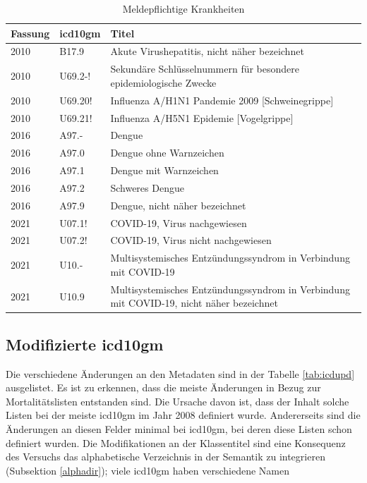 \begin{table}[ht]
	\centering
	\small
	\caption[Meldepflichtige \acs{icd10gm}]{Meldepflichtige Krankheiten}
	\label{tab:meldung}
	\begin{tabular}{|l|l|p{10.5cm}|}
		\hline
		\rowcolor{lightgray} Fassung & \acs{icd10gm} & Titel \\ \hline
		2010 & B17.9 & Akute Virushepatitis, nicht näher bezeichnet \\ \hline
		2010 & U69.2-! & Sekundäre Schlüsselnummern für besondere epidemiologische Zwecke \\ \hline
		2010 & U69.20! & Influenza A/H1N1 Pandemie 2009 [Schweinegrippe] \\ \hline
		2010 & U69.21! & Influenza A/H5N1 Epidemie [Vogelgrippe] \\ \hline
		2016 & A97.- & Dengue \\ \hline
		2016 & A97.0 & Dengue ohne Warnzeichen \\ \hline
		2016 & A97.1 & Dengue mit Warnzeichen \\ \hline
		2016 & A97.2 & Schweres Dengue \\ \hline
		2016 & A97.9 & Dengue, nicht näher bezeichnet \\ \hline
		2021 & U07.1! & COVID-19, Virus nachgewiesen \\ \hline
		2021 & U07.2! & COVID-19, Virus nicht nachgewiesen \\ \hline
		2021 & U10.- & Multisystemisches Entzündungssyndrom in Verbindung mit COVID-19 \\ \hline
		2021 & U10.9 & Multisystemisches Entzündungssyndrom in Verbindung mit COVID-19, nicht näher bezeichnet \\ \hline
	\end{tabular}
\end{table}

\newpage

\subsection{Modifizierte \acs{icd10gm}}

Die verschiedene Änderungen an den Metadaten sind in der Tabelle \ref{tab:icdupd} ausgelistet. Es ist zu erkennen, dass die meiste Änderungen in Bezug zur Mortalitätslisten entstanden sind. Die Ursache davon ist, dass der Inhalt solche Listen bei der meiste \ac{icd10gm} im Jahr 2008 definiert wurde. Andererseits sind die Änderungen an diesen Felder minimal bei \ac{icd10gm}, bei deren diese Listen schon definiert wurden. Die Modifikationen an der Klassentitel sind eine Konsequenz des Versuchs das alphabetische Verzeichnis in der Semantik zu integrieren (Subsektion \ref{alphadir}); viele \ac{icd10gm} haben verschiedene Namen 

